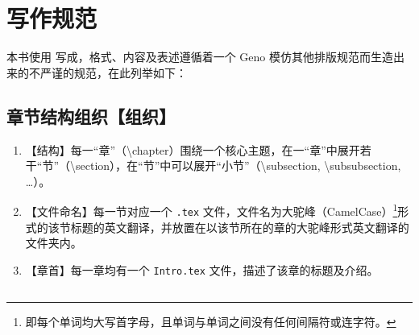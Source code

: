 \section*{写作规范}\label{sec:Preface/WritingGuideline}
    本书使用  写成，格式、内容及表述遵循着一个 Geno 模仿其他排版规范而生造出来的不严谨的规范，在此列举如下：

    \subsection*{章节结构组织【组织】}\label{subsec:Preface/WritingGuideline/ChapterAndSectionOrganization}
        \begin{enumerate}
            \item 【结构】每一“章”（\textbackslash chapter）围绕一个核心主题，在一“章”中展开若干“节”（\textbackslash section），在“节”中可以展开“小节”（\textbackslash subsection, \textbackslash subsubsection, \ldots）。
            \item 【文件命名】每一节对应一个 \texttt{.tex} 文件，文件名为大驼峰（CamelCase）\footnote{即每个单词均大写首字母，且单词与单词之间没有任何间隔符或连字符。}形式的该节标题的英文翻译，并放置在以该节所在的章的大驼峰形式英文翻译的文件夹内。
            \item 【章首】每一章均有一个 \texttt{Intro.tex} 文件，描述了该章的标题及介绍。
        \end{enumerate}
    \subsection*{}